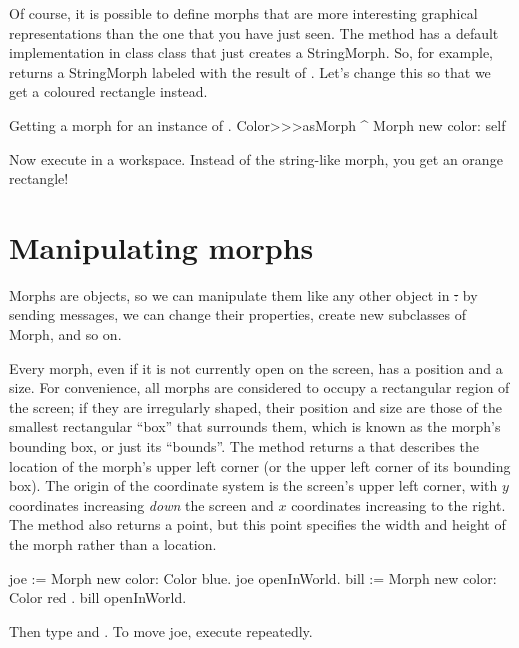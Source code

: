 \documentclass[a4paper,10pt,twoside]{book}
\begin{document}
Of course, it is possible to define morphs that are more interesting graphical representations than the one that you have just seen.
The method  has a default implementation in class  class that just creates a StringMorph.
So, for example,  returns a StringMorph labeled with the result of  .
Let's change this so that we get a coloured rectangle instead.

\begin{method}{Getting a morph for an instance of .}
Color>>>asMorph
	^ Morph new color: self
\end{method}
\noindent
Now execute   in a workspace. Instead of the string-like morph, you get an orange rectangle!


\section{Manipulating morphs}

Morphs are objects, so we can manipulate them like any other object in \st: by sending messages, we can change their properties, create new subclasses of Morph, and so on.

Every morph, even if it is not currently open on the screen, has a position and a size.  
For convenience, all morphs are considered to occupy a rectangular region of the screen; if they are irregularly shaped, their position and size are those of the smallest rectangular ``box'' that surrounds them, which is known as the morph's bounding box, or just its ``bounds''.
The  method returns a  that describes the location of the morph's upper left corner (or the upper left corner of its bounding box). 
The origin of the coordinate system is the screen's upper left corner, with $y$ coordinates increasing \emph{down} the screen and $x$ coordinates increasing to the right.
The  method also returns a point, but this point specifies the width and height of the morph rather than a location.

\begin{code}{}
joe := Morph new color: Color blue.
joe openInWorld.
bill := Morph new color: Color red .
bill openInWorld.
\end{code}
\noindent
Then type  and .
To move joe, execute  repeatedly.
\end{document}
